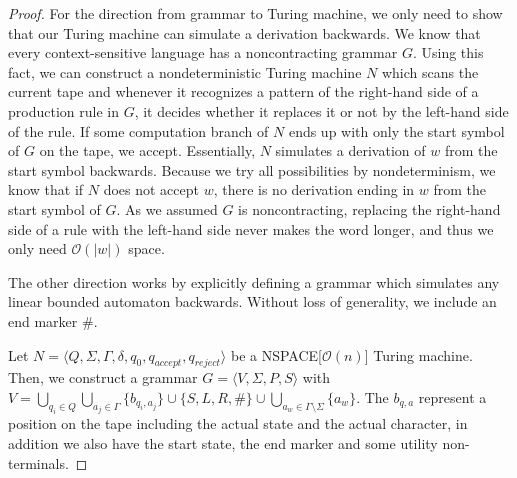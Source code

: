 \begin{proof}
    For the direction from grammar to Turing machine, we only need to show that our Turing machine can simulate a derivation backwards.
    We know that every context-sensitive language has a noncontracting grammar $G$.
    Using this fact, we can construct a nondeterministic Turing machine $N$ which scans the current tape and whenever it recognizes a pattern of the right-hand side of a production rule in $G$, it decides whether it replaces it or not by the left-hand side of the rule.
    If some computation branch of $N$ ends up with only the start symbol of $G$ on the tape, we accept.
    Essentially, $N$ simulates a derivation of $w$ from the start symbol backwards.
    Because we try all possibilities by nondeterminism, we know that if $N$ does not accept $w$, there is no derivation ending in $w$ from the start symbol of $G$.
    As we assumed $G$ is noncontracting, replacing the right-hand side of a rule with the left-hand side never makes the word longer, and thus we only need $\mathcal{O}(|w|)$ space.

    \vspace{5mm}

    The other direction works by explicitly defining a grammar which simulates any linear bounded automaton backwards.
    Without loss of generality, we include an end marker $\#$.

    Let $N = \langle Q, \Sigma, \Gamma, \delta, q_0, q_{accept}, q_{reject} \rangle$ be a NSPACE[$\mathcal{O}(n)$] Turing machine.
    Then, we construct a grammar $G = \langle V, \Sigma, P, S \rangle$ with $V = \bigcup_{q_i \in Q} \bigcup_{a_j \in \Gamma} \{b_{q_i, a_j}\} \cup \{S, L, R, \#\} \cup \bigcup_{a_w \in \Gamma \setminus \Sigma} \{a_w\}$.
    The $b_{q, a}$ represent a position on the tape including the actual state and the actual character, in addition we also have the start state, the end marker and some utility non-terminals.


\end{proof}
